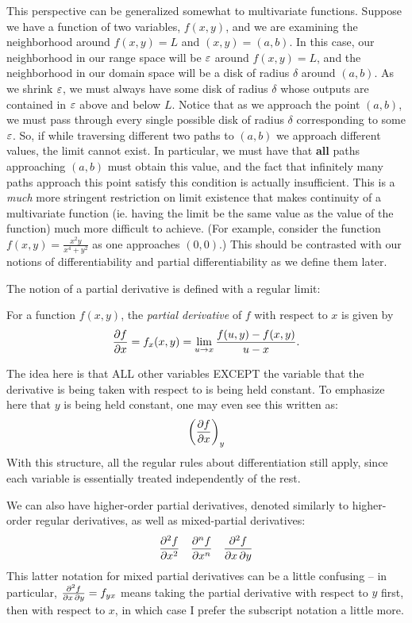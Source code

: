 This perspective can be generalized somewhat to multivariate functions. Suppose we have a function of two variables, $f(x,y)$, and we are examining the neighborhood around $f(x, y) = L$ and $(x, y) = (a, b)$. In this case, our neighborhood in our range space will be $\varepsilon$ around $f(x,y) = L$, and the neighborhood in our domain space will be a disk of radius $\delta$ around $(a, b)$. As we shrink $\varepsilon$, we must always have some disk of radius $\delta$ whose outputs are contained in $\varepsilon$ above and below $L$. Notice that as we approach the point $(a, b)$, we must pass through every single possible disk of radius $\delta$ corresponding to some $\varepsilon$. So, if while traversing different two paths to $(a, b)$ we approach different values, the limit cannot exist. In particular, we must have that \textbf{all} paths approaching $(a, b)$ must obtain this value, and the fact that infinitely many paths approach this point satisfy this condition is actually insufficient.  This is a \textit{much} more stringent restriction on limit existence that makes continuity of a multivariate function (ie. having the limit be the same value as the value of the function) much more difficult to achieve. (For example, consider the function $f(x, y) = \frac{x^2y}{x^4 + y^2}$ as one approaches $(0, 0)$.) This should be contrasted with our notions of differentiability and partial differentiability as we define them later. 

The notion of a partial derivative is defined with a regular limit: 
\begin{theorem}
For a function $f(x, y)$, the \textit{partial derivative} of $f$ with respect to $x$ is given by 
\[
	\frac{\partial f}{\partial x} = f_x(x, y) = \lim_{u \to x} \frac{f(u, y) - f(x, y)}{u-x}.
\]	
\end{theorem}

The idea here is that ALL other variables EXCEPT the variable that the derivative is being taken with respect to is being held constant. To emphasize here that $y$ is being held constant, one may even see this written as: \[ \left(\frac{\partial f}{\partial x}\right)_{y} \]
With this structure, all the regular rules about differentiation still apply, since each variable is essentially treated independently of the rest. 

We can also have higher-order partial derivatives, denoted similarly to higher-order regular derivatives, as well as mixed-partial derivatives: 
\[
	\frac{\partial^2 f}{\partial x^2} \quad \frac{\partial^{n} f}{\partial x^{n}} \quad \frac{\partial^2 f}{\partial x \, \partial y}
\]
This latter notation for mixed partial derivatives can be a little confusing -- in particular, $\frac{\partial^2 f}{\partial x \, \partial y} = f_{yx}$ means taking the partial derivative with respect to $y$ first, then with respect to $x$, in which case I prefer the subscript notation a little more. 

